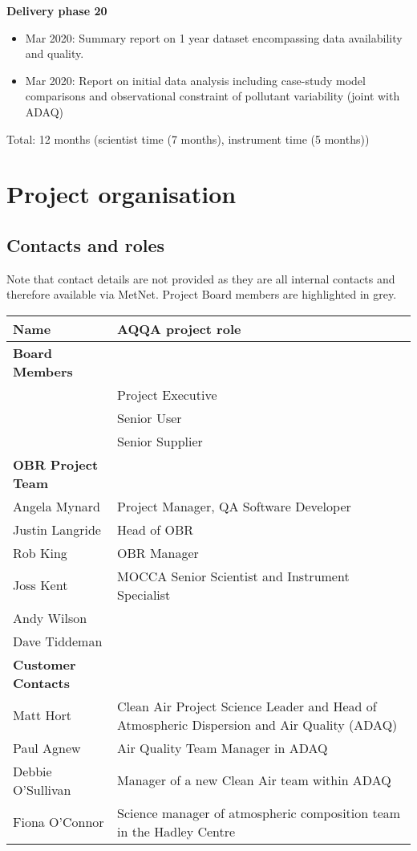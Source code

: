 \documentclass[11pt]{article} %
\begin{document}
\textbf{Delivery phase 20} 
\begin{itemize}
\item  Mar 2020: Summary report on 1 year dataset encompassing data availability and quality. 
\item  Mar 2020: Report on initial data analysis including case-study model comparisons and observational constraint of pollutant variability (joint with ADAQ) 
\end{itemize}
Total: 12 months (scientist time (7 months), instrument time (5 months)) 

\section{Project organisation}

\subsection{Contacts and roles}

Note that contact details are not provided as they are all internal contacts and therefore available via MetNet. Project Board members are highlighted in grey. \\


\begin{tabular}{|p{6cm}|p{9cm}|}
\hline
\textbf{Name} & \textbf{AQQA project role} \\ \hline

\textbf{Board Members} & \\ \hline
 & Project Executive \\ \hline
 & Senior User \\ \hline
 & Senior Supplier \\ \hline

\textbf{OBR Project Team} & \\ \hline
Angela Mynard & Project Manager, QA Software Developer \\ \hline
Justin Langride & Head of OBR \\ \hline
Rob King & OBR Manager  \\ \hline
Joss Kent & MOCCA Senior Scientist and Instrument Specialist  \\ \hline
Andy Wilson & \\ \hline
Dave Tiddeman & \\ \hline

\textbf{Customer Contacts} & \\ \hline
Matt Hort & Clean Air Project Science Leader and Head of Atmospheric Dispersion and Air Quality (ADAQ) \\ \hline
Paul Agnew & Air Quality Team Manager in ADAQ\\ \hline
Debbie O’Sullivan & Manager of a new Clean Air team within ADAQ \\ \hline
Fiona O’Connor & Science manager of atmospheric composition team in the Hadley Centre \\ \hline
\end{tabular}
\end{document}
